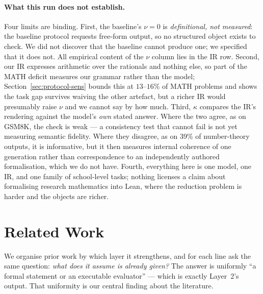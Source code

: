 \documentclass[11pt,a4paper]{article}
\begin{document}
\paragraph{What this run does not establish.}
Four limits are binding.  First, the baseline's $\nu = 0$ is
\emph{definitional, not measured}: the baseline protocol requests free-form
output, so no structured object exists to check.  We did not discover that the
baseline cannot produce one; we specified that it does not.  All empirical
content of the $\nu$ column lies in the IR row.  Second, our IR expresses
arithmetic over the rationals and nothing else, so part of the MATH deficit
measures our grammar rather than the model; Section~\ref{sec:protocol-sens}
bounds this at $13$--$16\%$ of MATH problems and shows the task gap survives
waiving the other artefact, but a richer IR would presumably raise $\nu$ and we
cannot say by how much.  Third, $\kappa$ compares the IR's rendering against the
model's \emph{own} stated answer.  Where the two agree, as on GSM8K, the check
is weak --- a consistency test that cannot fail is not yet measuring semantic
fidelity.  Where they disagree, as on 39\% of number-theory outputs, it is
informative, but it then measures internal coherence of one generation rather
than correspondence to an independently authored formalisation, which we do not
have.  Fourth, everything here is one model, one IR, and one family of
school-level tasks; nothing licenses a claim about formalising research
mathematics into Lean, where the reduction problem is harder and the objects are
richer.

\section{Related Work}
\label{sec:related}

We organise prior work by which layer it strengthens, and for each line ask the
same question: \emph{what does it assume is already given?}  The answer is
uniformly ``a formal statement or an executable evaluator'' --- which is exactly
Layer~2's output.  That uniformity is our central finding about the literature.
\end{document}
